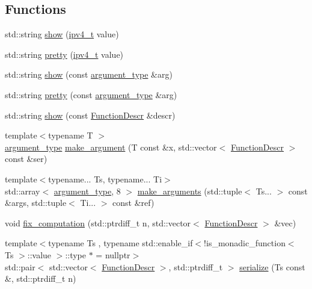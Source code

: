 \subsection*{Functions}
\begin{DoxyCompactItemize}
\item 
std\+::string \hyperlink{namespacepfq_1_1lang_a6b371b706602987f7e45c7558824fa34}{show} (\hyperlink{structpfq_1_1lang_1_1ipv4__t}{ipv4\+\_\+t} value)
\item 
std\+::string \hyperlink{namespacepfq_1_1lang_a7a4c9ec62feae5479366427beeff5b74}{pretty} (\hyperlink{structpfq_1_1lang_1_1ipv4__t}{ipv4\+\_\+t} value)
\item 
std\+::string \hyperlink{namespacepfq_1_1lang_a1e54c94175cad1980fc43030d265b58a}{show} (const \hyperlink{structpfq_1_1lang_1_1argument__type}{argument\+\_\+type} \&arg)
\item 
std\+::string \hyperlink{namespacepfq_1_1lang_a2dc4c3535607e668e86aa96674c41eb0}{pretty} (const \hyperlink{structpfq_1_1lang_1_1argument__type}{argument\+\_\+type} \&arg)
\item 
std\+::string \hyperlink{namespacepfq_1_1lang_a7e9458d3c3b90f405ee6df6cbfc43c58}{show} (const \hyperlink{structpfq_1_1lang_1_1FunctionDescr}{Function\+Descr} \&descr)
\item 
{\footnotesize template$<$typename T $>$ }\\\hyperlink{structpfq_1_1lang_1_1argument__type}{argument\+\_\+type} \hyperlink{namespacepfq_1_1lang_ac28f404ec59b7aea311721e0f26b5577}{make\+\_\+argument} (T const \&x, std\+::vector$<$ \hyperlink{structpfq_1_1lang_1_1FunctionDescr}{Function\+Descr} $>$ const \&ser)
\item 
{\footnotesize template$<$typename... Ts, typename... Ti$>$ }\\std\+::array$<$ \hyperlink{structpfq_1_1lang_1_1argument__type}{argument\+\_\+type}, 8 $>$ \hyperlink{namespacepfq_1_1lang_aacc9139aafd72e1f19af3a74c1fdc6dc}{make\+\_\+arguments} (std\+::tuple$<$ Ts... $>$ const \&args, std\+::tuple$<$ Ti... $>$ const \&ref)
\item 
void \hyperlink{namespacepfq_1_1lang_adffac06fa2bba45eca6f8eeab33262d2}{fix\+\_\+computation} (std\+::ptrdiff\+\_\+t n, std\+::vector$<$ \hyperlink{structpfq_1_1lang_1_1FunctionDescr}{Function\+Descr} $>$ \&vec)
\item 
{\footnotesize template$<$typename Ts , typename std\+::enable\+\_\+if$<$!is\+\_\+monadic\+\_\+function$<$ Ts $>$\+::value $>$\+::type $\ast$  = nullptr$>$ }\\std\+::pair$<$ std\+::vector$<$ \hyperlink{structpfq_1_1lang_1_1FunctionDescr}{Function\+Descr} $>$, std\+::ptrdiff\+\_\+t $>$ \hyperlink{namespacepfq_1_1lang_ae121f9fc8e23fbd6873d45d02e9adb81}{serialize} (Ts const \&, std\+::ptrdiff\+\_\+t n)

\end{DoxyCompactItemize}
